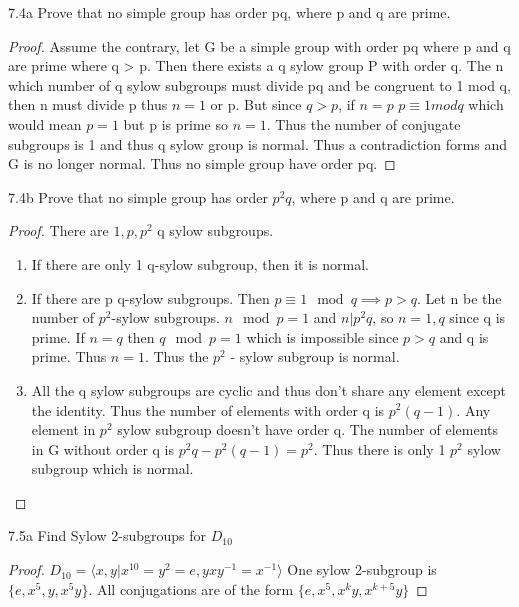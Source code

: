 \documentclass{article}
\begin{document}
\bigskip

\begin{PROB}{7.4a}\label{Problem 7.4a.}
    Prove that no simple group has order pq, where p and q are prime.
\end{PROB}
\begin{proof}
    Assume the contrary, let G be a simple group with order pq where p and q are prime where q > p. Then there exists a q sylow group P with order q. The n which number of q sylow subgroups must divide pq and be congruent to 1 mod q, then n must divide p thus $n = 1$ or p. But since $q > p$, if $n = p$ $p \equiv 1 mod q$ which would mean $p = 1$ but p is prime so $n = 1$. Thus the number of conjugate subgroups is 1 and thus q sylow group is normal. Thus a contradiction forms and G is no longer normal. Thus no simple group have order pq.  
\end{proof}
\bigskip
\begin{PROB}{7.4b}\label{Problem 7.4b.}
    Prove that no simple group has order $p^2q$, where p and q are prime.
\end{PROB}
\begin{proof}
    There are $1, p, p^2$ q sylow subgroups.

    \begin{enumerate}{}
        \item If there are only 1 q-sylow subgroup, then it is normal. 
        \item If there are p q-sylow subgroups. Then $p \equiv 1 \mod q \implies p > q$. Let n be the number of $p^2$-sylow subgroups. $n \mod p = 1$ and $n | p^2q$, so $n = 1, q$ since q is prime. If $n = q$ then $q \mod p = 1$ which is impossible since $p > q$ and q is prime. Thus $n =1$. Thus the $p^2$ - sylow subgroup is normal.
        \item All the q sylow subgroups are cyclic and thus don't share any element except the identity. Thus the number of elements with order q is $p^2(q - 1)$. Any element in $p^2$ sylow subgroup doesn't have order q. The number of elements in G without order q is $p^2q - p^2(q - 1) = p^2$. Thus there is only 1 $p^2$ sylow subgroup which is normal.
    \end{enumerate}
\end{proof}

\bigskip

\begin{PROB}{7.5a}\label{Problem 7.5a.}
    Find Sylow 2-subgroups for $D_{10}$
\end{PROB}
\begin{proof}
    $D_{10} = \langle x, y | x^{10} = y^2 = e, yxy^{-1} = x^{-1} \rangle$
    One sylow 2-subgroup is $\{e, x^5, y, x^5y\}$. All conjugations are of the form $\{e, x^5, x^ky, x^{k + 5}y\}$
\end{proof}
\end{document}
